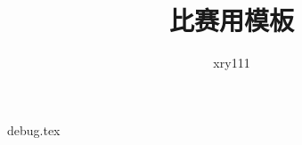 \documentclass{article}
\title{比赛用模板}
\author{xry111}
\begin{document}
\maketitle

\tableofcontents











\graphicspath{{./debug/}}
{debug.tex}
\end{document}
